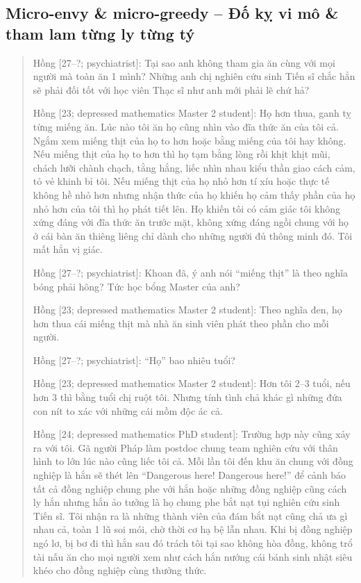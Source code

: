\documentclass[12pt,twoside]{book}
\begin{document}
\subsection{Micro-envy \& micro-greedy -- Đố kỵ vi mô \& tham lam từng ly từng tý}

\begin{quote}
	{\sf Hồng [27--?; psychiatrist]}: Tại sao anh không tham gia ăn cùng với mọi người mà toàn ăn 1 mình? Những anh chị nghiên cứu sinh Tiến sĩ chắc hẳn sẽ phải đối tốt với học viên Thạc sĩ như anh mới phải lẽ chứ hả?
	
	{\sf Hồng [23; depressed mathematics Master 2 student]}: Họ hơn thua, ganh tỵ từng miếng ăn. Lúc nào tôi ăn họ cũng nhìn vào đĩa thức ăn của tôi cả. Ngắm xem miếng thịt của họ to hơn hoặc bằng miếng của tôi hay không. Nếu miếng thịt của họ to hơn thì họ tạm bằng lòng rồi khịt khịt mũi, chách lưỡi chành chạch, tằng hắng, liếc nhìn nhau kiểu thần giao cách cảm, tỏ vẻ khinh bỉ tôi. Nếu miếng thịt của họ nhỏ hơn tí xíu hoặc thực tế không hề nhỏ hơn nhưng nhận thức của họ khiến họ cảm thấy phần của họ nhỏ hơn của tôi thì họ phát tiết lên. Họ khiến tôi có cảm giác tôi không xứng đáng với đĩa thức ăn trước mặt, không xứng đáng ngồi chung với họ ở cái bàn ăn thiêng liêng chỉ dành cho những người đủ thông minh đó. Tôi mất hẳn vị giác.
	
	{\sf Hồng [27--?; psychiatrist]}: Khoan đã, ý anh nói ``miếng thịt'' là theo nghĩa bóng phải hông? Tức học bổng Master của anh?
	
	{\sf Hồng [23; depressed mathematics Master 2 student]}: Theo nghĩa đen, họ hơn thua cái miếng thịt mà nhà ăn sinh viên phát theo phần cho mỗi người.
	
	{\sf Hồng [27--?; psychiatrist]}: ``Họ'' bao nhiêu tuổi?
	
	{\sf Hồng [23; depressed mathematics Master 2 student]}: Hơn tôi 2--3 tuổi, nếu hơn 3 thì bằng tuổi chị ruột tôi. Nhưng tính tình chả khác gì những đứa con nít to xác với những cái mồm độc ác cả.
	
	{\sf Hồng [24; depressed mathematics PhD student]}: Trường hợp này cũng xảy ra với tôi. Gã người Pháp làm postdoc chung team nghiên cứu với thân hình to lớn lúc nào cũng liếc tôi cả. Mỗi lần tôi đến khu ăn chung với đồng nghiệp là hắn sẽ thét lên ``Dangerous here! Dangerous here!'' để cảnh báo tất cả đồng nghiệp chung phe với hắn hoặc những đồng nghiệp cũng cách ly hắn nhưng hắn ảo tưởng là họ chung phe bắt nạt tụi nghiên cứu sinh Tiến sĩ. Tôi nhận ra là những thành viên của đám bắt nạt cũng chả ưa gì nhau cả, toàn 1 lũ soi mói, chờ thời cơ hạ bệ lẫn nhau. Khi bị đồng nghiệp ngó lơ, bị bơ đi thì hắn sau đó trách tôi tại sao không hòa đồng, không trổ tài nấu ăn cho mọi người xem như cách hắn nướng cái bánh sinh nhật siêu khéo cho đồng nghiệp cùng thưởng thức.
	

\end{quote}
\end{document}
